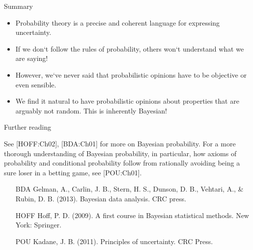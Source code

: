 \begin{frame}{Summary}

\begin{itemize}
\item Probability theory is a precise and coherent language for expressing uncertainty.
\item If we don‘t follow the rules of probability, others won‘t understand what we are saying!
\item However, we‘ve never said that probabilistic opinions have to be objective or even sensible.
\item We find it natural to have probabilistic opinions about properties that are arguably not random. This is inherently Bayesian!
\end{itemize}
\end{frame}

\begin{frame}{Further reading}

See [HOFF:Ch02], [BDA:Ch01] for more on Bayesian probability. For a more thorough understanding of Bayesian probability, in particular, how axioms of probability and conditional probability follow from rationally avoiding being a sure loser in a betting game, see [POU:Ch01].

\bigskip

\begin{scriptsize}
\begin{itemize}
\item[BDA] Gelman, A., Carlin, J. B., Stern, H. S., Dunson, D. B., Vehtari, A., \& Rubin, D. B. (2013). Bayesian data analysis. CRC press.
\item[HOFF] Hoff, P. D. (2009). A first course in Bayesian statistical methods. New York: Springer.
\item [POU] Kadane, J. B. (2011). Principles of uncertainty. CRC Press.
\end{itemize}
\end{scriptsize}
\end{frame}


